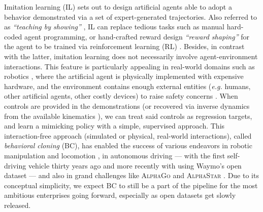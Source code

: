Imitation learning (IL) \cite{Bagnell2015-ni} sets out to design artificial agents able to adopt
a behavior demonstrated via a set of expert-generated trajectories.
Also referred to as \textit{``teaching by showing''} \cite{Schaal1997-vi},
IL can replace tedious tasks such as manual hard-coded agent programming, or
hand-crafted reward design \textit{``reward shaping''} \cite{Ng1999-lv}
for the agent to be trained via reinforcement learning (RL) \cite{Sutton1998-ow}.
Besides, in contrast with the latter, imitation learning does not necessarily involve
agent-environment interactions.
This feature is particularly appealing in real-world domains such as robotics
\cite{Atkeson1997-db,Schaal1997-vi,Ratliff2007-fc,Billard2008-jb},
where the artificial agent is physically implemented with expensive hardware,
and the environment contains enough external entities
(\textit{e.g.} humans, other artificial agents, other costly devices)
to raise safety concerns \cite{Ha2020-vb,Kahn2016-cq,Ray2019-xf,Held2017-wo}.
When controls are provided in the demonstrations
(or recovered via inverse dynamics from the available kinematics \cite{Hanna2017-iz}),
we can treat said controls as regression targets,
and learn a mimicking policy with a simple, supervised approach.
This interaction-free approach (simulated or physical, real-world interactions),
called \emph{behavioral cloning} (BC),
has enabled the success of various endeavors
in robotic manipulation and locomotion \cite{Ratliff2007-fc,Wang2017-eq},
in autonomous driving ---
with the first self-driving vehicle \cite{Pomerleau1989-nh,Pomerleau1990-lm} thirty years ago
and more recently with \cite{Gu2020-fo} using Waymo's open dataset \cite{Sun2019-qc} ---
and also in grand challenges like \textsc{AlphaGo} \cite{Silver2016-my}
and \textsc{AlphaStar} \cite{Vinyals2019-vx}.
Due to its conceptual simplicity, we expect BC to still be a part of the pipeline
for the most ambitious enterprises going forward,
especially as open datasets get slowly released.

